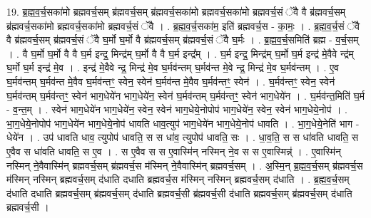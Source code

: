 \documentclass[17pt]{extarticle}
\begin{document}
19. ब्र॒ह्म॒व॒र्च॒सका॑मो ब्रह्मवर्च॒सम् ब्र॑ह्मवर्च॒सम् ब्र॑ह्मवर्च॒सका॑मो ब्रह्मवर्च॒सका॑मो ब्रह्मवर्च॒सं ॅवै वै ब्र॑ह्मवर्च॒सम् ब्र॑ह्मवर्च॒सका॑मो ब्रह्मवर्च॒सका॑मो ब्रह्मवर्च॒सं ॅवै । . ब्र॒ह्म॒व॒र्च॒सका॑म॒ इति॑ ब्रह्मवर्च॒स - का॒मः॒ । . ब्र॒ह्म॒व॒र्च॒सं ॅवै वै ब्र॑ह्मवर्च॒सम् ब्र॑ह्मवर्च॒सं ॅवै घ॒र्मो घ॒र्मो वै ब्र॑ह्मवर्च॒सम् ब्र॑ह्मवर्च॒सं ॅवै घ॒र्मः । . ब्र॒ह्म॒व॒र्च॒समिति॑ ब्रह्म - व॒र्च॒सम् । . वै घ॒र्मो घ॒र्मो वै वै घ॒र्म इन्द्र॒ मिन्द्र॑म् घ॒र्मो वै वै घ॒र्म इन्द्र᳚म् । . घ॒र्म इन्द्र॒ मिन्द्र॑म् घ॒र्मो घ॒र्म इन्द्र॑ मे॒वैवे न्द्र॑म् घ॒र्मो घ॒र्म इन्द्र॑ मे॒व । . इन्द्र॑ मे॒वैवे न्द्र॒ मिन्द्र॑ मे॒व घ॒र्मव॑न्तम् घ॒र्मव॑न्त मे॒वे न्द्र॒ मिन्द्र॑ मे॒व घ॒र्मव॑न्तम् । . ए॒व घ॒र्मव॑न्तम् घ॒र्मव॑न्त मे॒वैव घ॒र्मव॑न्तꣳ॒॒ स्वेन॒ स्वेन॑ घ॒र्मव॑न्त मे॒वैव घ॒र्मव॑न्तꣳ॒॒ स्वेन॑ । . घ॒र्मव॑न्तꣳ॒॒ स्वेन॒ स्वेन॑ घ॒र्मव॑न्तम् घ॒र्मव॑न्तꣳ॒॒ स्वेन॑ भाग॒धेये॑न भाग॒धेये॑न॒ स्वेन॑ घ॒र्मव॑न्तम् घ॒र्मव॑न्तꣳ॒॒ स्वेन॑ भाग॒धेये॑न । . घ॒र्मव॑न्त॒मिति॑ घ॒र्म - व॒न्त॒म् । . स्वेन॑ भाग॒धेये॑न भाग॒धेये॑न॒ स्वेन॒ स्वेन॑ भाग॒धेये॒नोपोप॑ भाग॒धेये॑न॒ स्वेन॒ स्वेन॑ भाग॒धेये॒नोप॑ । . भा॒ग॒धेये॒नोपोप॑ भाग॒धेये॑न भाग॒धेये॒नोप॑ धावति धाव॒त्युप॑ भाग॒धेये॑न भाग॒धेये॒नोप॑ धावति । . भा॒ग॒धेये॒नेति॑ भाग - धेये॑न । . उप॑ धावति धाव॒ त्युपोप॑ धावति॒ स स धा॑व॒ त्युपोप॑ धावति॒ सः । . धा॒व॒ति॒ स स धा॑वति धावति॒ स ए॒वैव स धा॑वति धावति॒ स ए॒व । . स ए॒वैव स स ए॒वास्मि॑न् नस्मिन् ने॒व स स ए॒वास्मिन्न्॑ । . ए॒वास्मि॑न् नस्मिन् ने॒वैवास्मि॑न् ब्रह्मवर्च॒सम् ब्र॑ह्मवर्च॒स म॑स्मिन् ने॒वैवास्मि॑न् ब्रह्मवर्च॒सम् । . अ॒स्मि॒न् ब्र॒ह्म॒व॒र्च॒सम् ब्र॑ह्मवर्च॒स म॑स्मिन् नस्मिन् ब्रह्मवर्च॒सम् द॑धाति दधाति ब्रह्मवर्च॒स म॑स्मिन् नस्मिन् ब्रह्मवर्च॒सम् द॑धाति । . ब्र॒ह्म॒व॒र्च॒सम् द॑धाति दधाति ब्रह्मवर्च॒सम् ब्र॑ह्मवर्च॒सम् द॑धाति ब्रह्मवर्च॒सी ब्र॑ह्मवर्च॒सी द॑धाति ब्रह्मवर्च॒सम् ब्र॑ह्मवर्च॒सम् द॑धाति ब्रह्मवर्च॒सी । \newline
\end{document}
